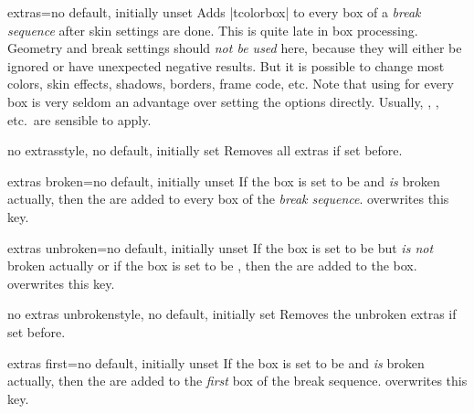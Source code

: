 \begin{docTcbKey}[][doc new=2015-07-16]{extras}{=}{no default, initially unset}
  Adds |tcolorbox|  to every box of a \emph{break sequence}
  after skin settings are done. This is quite late in box processing.
  Geometry and break settings should \emph{not be used} here, because they
  will either be ignored or have unexpected negative results. But it is possible
  to change most colors, skin effects, shadows, borders, frame code, etc.
  Note that using  for every box is very seldom an
  advantage over setting the options directly. Usually, ,
  , etc.\ are sensible to apply.
\end{docTcbKey}


\begin{docTcbKey}[][doc new=2015-07-16]{no extras}{}{style, no default, initially set}
  Removes all extras if set before.
\end{docTcbKey}


\begin{docTcbKey}[][doc new=2015-07-16]{extras broken}{=}{no default, initially unset}
  If the box is set to be  and \emph{is} broken actually,
  then the  are added to every box of the \emph{break sequence}.
   overwrites this key.
\end{docTcbKey}

\begin{docTcbKey}[][doc new=2015-07-16]{extras unbroken}{=}{no default, initially unset}
  If the box is set to be  but \emph{is not} broken actually
  or if the box is set to be ,
  then the  are added to the box.
   overwrites this key.
\end{docTcbKey}

\begin{docTcbKey}[][doc new=2015-07-16]{no extras unbroken}{}{style, no default, initially set}
  Removes the unbroken extras if set before.
\end{docTcbKey}

\begin{docTcbKey}[][doc new=2015-07-16]{extras first}{=}{no default, initially unset}
  If the box is set to be  and \emph{is} broken actually,
  then the  are added to the \emph{first} box of the break sequence.
   overwrites this key.
\end{docTcbKey}

